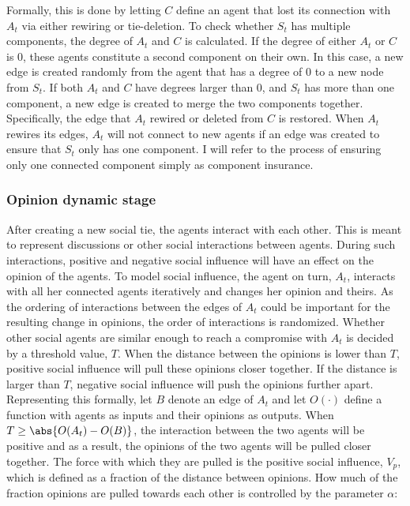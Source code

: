 \documentclass[11pt]{article}
\DeclarePairedDelimiter{\abs}\lvert\rvert
\begin{document}
Formally, this is done by letting $C$ define an agent that lost its connection with $A_t$ via either rewiring or tie-deletion. To check whether $S_t$ has multiple components, the degree of $A_t$ and $C$ is calculated. If the degree of either $A_t$ or $C$ is 0, these agents constitute a second component on their own. In this case, a new edge is created randomly from the agent that has a degree of 0 to a new node from $S_t$.  
If both $A_t$ and $C$ have degrees larger than 0, and $S_t$ has more than one component, a new edge is created to merge the two components together. Specifically, the edge that $A_t$ rewired or deleted from $C$ is restored.
When $A_t$ rewires its edges, $A_t$ will not connect to new agents if an edge was created to ensure that $S_t$ only has one component.
I will refer to the process of ensuring only one connected component simply as component insurance. 

\subsubsection{Opinion dynamic stage}
After creating a new social tie, the agents interact with each other. This is meant to represent discussions or other social interactions between agents. During such interactions, positive and negative social influence will have an effect on the opinion of the agents. 
To model social influence, the agent on turn, $A_t$, interacts with all her connected agents iteratively and changes her opinion and theirs. 
As the ordering of interactions between the edges of $A_t$ could be important for the resulting change in opinions, the order of interactions is randomized. Whether other social agents are similar enough to reach a compromise with $A_t$ is decided by a threshold value, $T$. When the distance between the opinions is lower than $T$, positive social influence will pull these opinions closer together. If the distance is larger than $T$, negative social influence will push the opinions further apart.
Representing this formally, let $B$ denote an edge of $A_t$ and let $O(\cdot)$ define a function with agents as inputs and their opinions as outputs.
When $T \geq \abs{O(A_t) - O(B)}$, the interaction between the two agents will be positive and as a result, the opinions of the two agents will be pulled closer together. The force with which they are pulled is the positive social influence, $V_p$, which is defined as a fraction of the distance between opinions. How much of the fraction opinions are pulled towards each other is controlled by the parameter $\alpha$:
\end{document}
